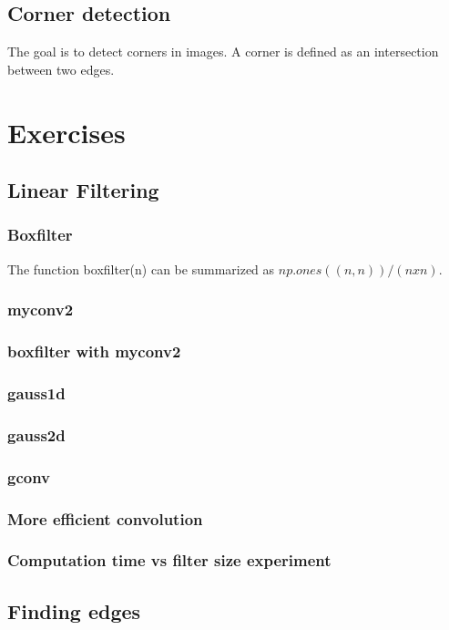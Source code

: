 \documentclass[12pt]{article}
\begin{document}
\subsection{Corner detection}
The goal is to detect corners in images. A corner is defined as an intersection
between two edges. 

\section{Exercises}
\subsection{Linear Filtering}
\subsubsection{Boxfilter}
The function boxfilter(n) can be summarized as $np.ones((n, n)) / (n x n)$.


\subsubsection{myconv2}


\subsubsection{boxfilter with myconv2}
\subsubsection{gauss1d}
\subsubsection{gauss2d}
\subsubsection{gconv}
\subsubsection{More efficient convolution}
 

\subsubsection{Computation time vs filter size experiment}

\subsection{Finding edges}
\end{document}
